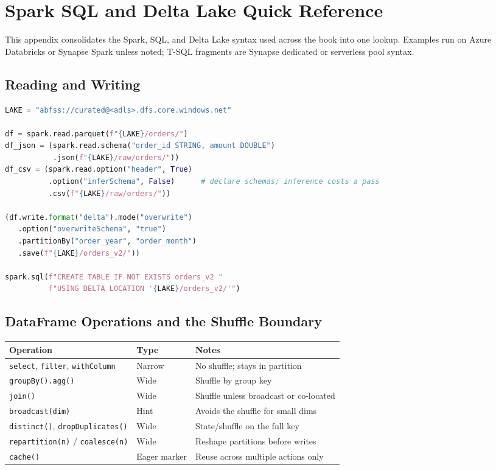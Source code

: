 \chapter{Spark SQL and Delta Lake Quick Reference}
%
This appendix consolidates the Spark, SQL, and Delta Lake syntax used across the
book into one lookup. Examples run on Azure Databricks or Synapse Spark unless
noted; T-SQL fragments are Synapse dedicated or serverless pool syntax.

\section{Reading and Writing}

\begin{lstlisting}[language=Python,caption={The lake read/write patterns used throughout Parts II--V.},label={lst:app-spark-io}]
LAKE = "abfss://curated@<adls>.dfs.core.windows.net"

df = spark.read.parquet(f"{LAKE}/orders/")
df_json = (spark.read.schema("order_id STRING, amount DOUBLE")
           .json(f"{LAKE}/raw/orders/"))
df_csv = (spark.read.option("header", True)
          .option("inferSchema", False)      # declare schemas; inference costs a pass
          .csv(f"{LAKE}/raw/orders/"))

(df.write.format("delta").mode("overwrite")
   .option("overwriteSchema", "true")
   .partitionBy("order_year", "order_month")
   .save(f"{LAKE}/orders_v2/"))

spark.sql(f"CREATE TABLE IF NOT EXISTS orders_v2 "
          f"USING DELTA LOCATION '{LAKE}/orders_v2/'")
\end{lstlisting}

\section{DataFrame Operations and the Shuffle Boundary}

\begin{center}
\footnotesize
\begin{tabular}{@{}p{5.6cm}p{3.2cm}p{4.4cm}@{}}
\toprule
\textbf{Operation} & \textbf{Type} & \textbf{Notes} \\
\midrule
\texttt{select}, \texttt{filter}, \texttt{withColumn} & Narrow & No shuffle; stays in partition \\
\texttt{groupBy().agg()} & Wide & Shuffle by group key \\
\texttt{join()} & Wide & Shuffle unless broadcast or co-located \\
\texttt{broadcast(dim)} & Hint & Avoids the shuffle for small dims \\
\texttt{distinct()}, \texttt{dropDuplicates()} & Wide & State/shuffle on the full key \\
\texttt{repartition(n)} / \texttt{coalesce(n)} & Wide & Reshape partitions before writes \\
\texttt{cache()} & Eager marker & Reuse across multiple actions only \\
\bottomrule
\end{tabular}
\end{center}

